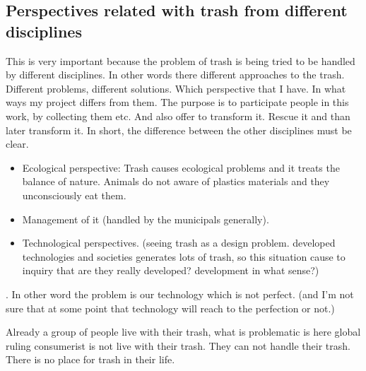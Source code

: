 \subsection{Perspectives related with trash from different disciplines}
This is very important because the problem of trash is being tried to be handled by different disciplines. In other words there different approaches to the trash. Different problems, different solutions. Which perspective that I have. In what ways my project differs from them. The purpose is to participate people in this work, by collecting them etc. And also offer to transform it. Rescue it and than later transform it. In short, the difference between the other disciplines must be clear. 
\begin{itemize}
\item Ecological perspective: Trash causes ecological problems and it treats the balance of nature. Animals do not aware of plastics materials and they unconsciously eat them.
\item Management of it (handled by the municipals generally).
\item Technological perspectives. (seeing trash as a design problem. developed technologies and societies generates lots of trash, so this situation cause to inquiry that are they really developed? development in what sense?)
\end{itemize}


 \cite{mcdonough2010cradle}. In other word the problem is our technology which is not perfect. (and I'm not sure that at some point that technology will reach to the perfection or not.)

\cite{} Already a group of people live with their trash, what is problematic is here global ruling consumerist is not live with their trash. They can not handle their trash. There is no place for trash in their life.

